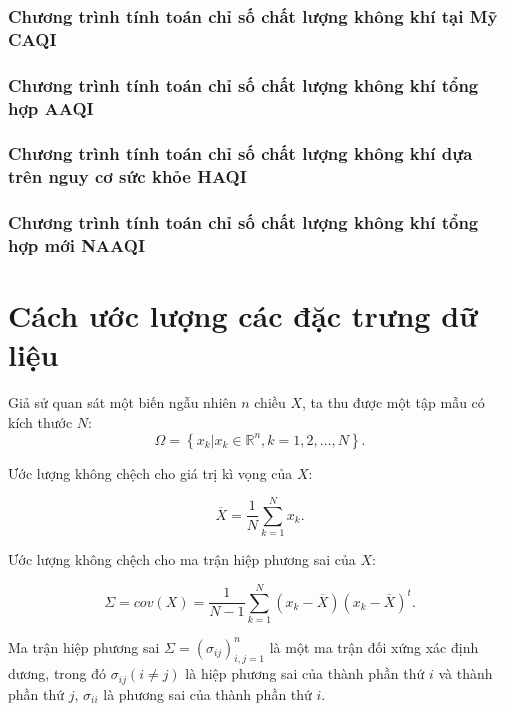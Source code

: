\documentclass[14pt]{extreport}
\theoremstyle{definition}
\theoremstyle{plain}
\theoremstyle{remark}
\begin{document}
\begin{appendices}
\subsection{Chương trình tính toán chỉ số chất lượng không khí tại Mỹ CAQI}


\subsection{Chương trình tính toán chỉ số chất lượng không khí tổng hợp AAQI}


\subsection{Chương trình tính toán chỉ số chất lượng không khí dựa trên nguy cơ sức khỏe HAQI}


\subsection{Chương trình tính toán chỉ số chất lượng không khí tổng hợp mới NAAQI}


\chapter{Cách ước lượng các đặc trưng dữ liệu}
Giả sử quan sát một biến ngẫu nhiên $n$ chiều $X$, ta thu được một tập mẫu có kích thước $N$:
\begin{equation}
\Omega = \left\lbrace x_k| x_k \in \mathbb{R}^n, k=1, 2, \ldots, N \right\rbrace.
\end{equation}
\begin{flushleft}
Ước lượng không chệch cho giá trị kì vọng của $X$:
\end{flushleft}
\begin{equation}
\overline{X} = \dfrac{1}{N} \sum_{k=1}^N x_k.
\end{equation}

\begin{flushleft}
Ước lượng không chệch cho ma trận hiệp phương sai của $X$:
\end{flushleft}
\begin{equation}
\Sigma = cov(X) = \dfrac{1}{N - 1} \sum_{k=1}^N (x_k - \overline{X})(x_k - \overline{X})^t.
\end{equation}

\begin{flushleft}
Ma trận hiệp phương sai $\Sigma = \left(\sigma_{ij} \right)_{i,j = 1}^n$ là một ma trận đối xứng xác định dương, trong đó $\sigma_{ij} (i\neq j)$ là hiệp phương sai của thành phần thứ $i$ và thành phần thứ $j$, $\sigma_{ii}$ là phương sai của thành phần thứ $i$.
\end{flushleft}


\end{appendices}
\end{document}

